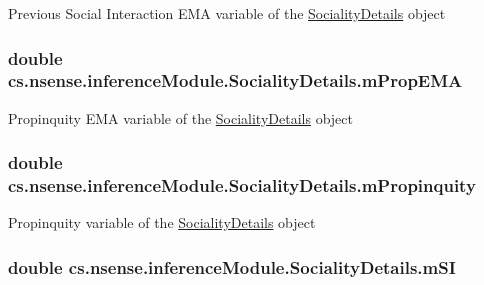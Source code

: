 Previous Social Interaction E\-M\-A variable of the \hyperlink{classcs_1_1nsense_1_1inference_module_1_1_sociality_details}{Sociality\-Details} object \hypertarget{classcs_1_1nsense_1_1inference_module_1_1_sociality_details_ad774c9e34300d93e24f485e907e92b9e}{
\subsubsection[{m\-Prop\-E\-M\-A}]{\setlength{\rightskip}{0pt plus 5cm}double cs.\-nsense.\-inference\-Module.\-Sociality\-Details.\-m\-Prop\-E\-M\-A}}\label{classcs_1_1nsense_1_1inference_module_1_1_sociality_details_ad774c9e34300d93e24f485e907e92b9e}
Propinquity E\-M\-A variable of the \hyperlink{classcs_1_1nsense_1_1inference_module_1_1_sociality_details}{Sociality\-Details} object \hypertarget{classcs_1_1nsense_1_1inference_module_1_1_sociality_details_af89d988e5ebf957e2fbdc430223bb670}{
\subsubsection[{m\-Propinquity}]{\setlength{\rightskip}{0pt plus 5cm}double cs.\-nsense.\-inference\-Module.\-Sociality\-Details.\-m\-Propinquity}}\label{classcs_1_1nsense_1_1inference_module_1_1_sociality_details_af89d988e5ebf957e2fbdc430223bb670}
Propinquity variable of the \hyperlink{classcs_1_1nsense_1_1inference_module_1_1_sociality_details}{Sociality\-Details} object \hypertarget{classcs_1_1nsense_1_1inference_module_1_1_sociality_details_a0a174fb0173d3bb05af5a224af0dc1e1}{
\subsubsection[{m\-S\-I}]{\setlength{\rightskip}{0pt plus 5cm}double cs.\-nsense.\-inference\-Module.\-Sociality\-Details.\-m\-S\-I}}\label{classcs_1_1nsense_1_1inference_module_1_1_sociality_details_a0a174fb0173d3bb05af5a224af0dc1e1}
